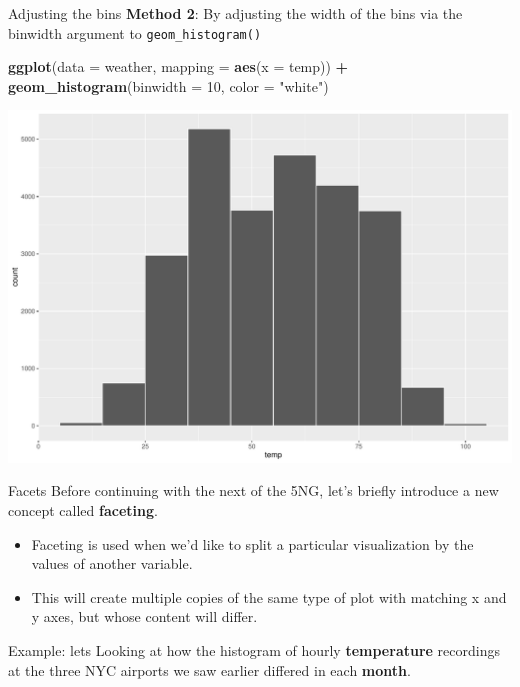 \documentclass[
  ignorenonframetext,
]{beamer}
\newenvironment{Shaded}{\begin{snugshade}}{\end{snugshade}}
\newcommand{\AttributeTok}[1]{\textcolor[rgb]{0.13,0.29,0.53}{#1}}
\newcommand{\DecValTok}[1]{\textcolor[rgb]{0.00,0.00,0.81}{#1}}
\newcommand{\FunctionTok}[1]{\textcolor[rgb]{0.13,0.29,0.53}{\textbf{#1}}}
\newcommand{\NormalTok}[1]{#1}
\newcommand{\SpecialCharTok}[1]{\textcolor[rgb]{0.81,0.36,0.00}{\textbf{#1}}}
\newcommand{\StringTok}[1]{\textcolor[rgb]{0.31,0.60,0.02}{#1}}
\begin{document}
\begin{frame}[fragile]{Adjusting the bins}
\protect\hypertarget{adjusting-the-bins-1}{}
\textbf{Method 2}: By adjusting the width of the bins via the binwidth
argument to \texttt{geom\_histogram()}

\tiny

\begin{Shaded}
\begin{Highlighting}[]
\FunctionTok{ggplot}\NormalTok{(}\AttributeTok{data =}\NormalTok{ weather, }\AttributeTok{mapping =} \FunctionTok{aes}\NormalTok{(}\AttributeTok{x =}\NormalTok{ temp)) }\SpecialCharTok{+}
  \FunctionTok{geom\_histogram}\NormalTok{(}\AttributeTok{binwidth =} \DecValTok{10}\NormalTok{, }\AttributeTok{color =} \StringTok{"white"}\NormalTok{)}
\end{Highlighting}
\end{Shaded}

\begin{center}\includegraphics[width=0.7\linewidth,height=0.5\textheight]{Week2_Lect_files/figure-beamer/unnamed-chunk-30-1} \end{center}
\normalsize
\end{frame}

\begin{frame}{Facets}
\protect\hypertarget{facets}{}
Before continuing with the next of the 5NG, let's briefly introduce a
new concept called \textbf{faceting}.

\begin{itemize}
\item
  Faceting is used when we'd like to split a particular visualization by
  the values of another variable.
\item
  This will create multiple copies of the same type of plot with
  matching x and y axes, but whose content will differ.
\end{itemize}

Example: lets Looking at how the histogram of hourly
\textbf{temperature} recordings at the three NYC airports we saw earlier
differed in each \textbf{month}.
\end{frame}
\end{document}
